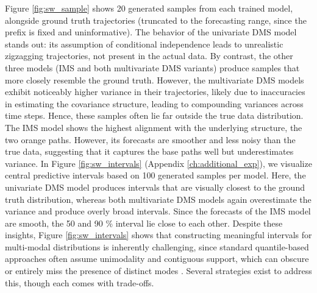 \documentclass[a4paper,oneside,bibliography=totoc]{scrbook}
\begin{document}
Figure \ref{fig:sw_sample} shows 20 generated samples from each trained model, alongside ground truth trajectories (truncated to the forecasting range, since the prefix is fixed and uninformative). The behavior of the univariate DMS model stands out: its assumption of conditional independence leads to unrealistic zigzagging trajectories, not present in the actual data.
By contrast, the other three models (IMS and both multivariate DMS variants) produce samples that more closely resemble the ground truth. However, the multivariate DMS models exhibit noticeably higher variance in their trajectories, likely due to inaccuracies in estimating the covariance structure, leading to compounding variances across time steps. 
Hence, these samples often lie far outside the true data distribution.
The IMS model shows the highest alignment with the underlying structure, the two orange paths. However, its forecasts are smoother and less noisy than the true data, suggesting that it captures the base paths well but underestimates variance.
In Figure \ref{fig:sw_intervals} (Appendix \ref{ch:additional_exp}), we visualize central predictive intervals based on 100 generated samples per model. 
Here, the univariate DMS model produces intervals that are visually closest to the ground truth distribution, whereas both multivariate DMS models again overestimate the variance and produce overly broad intervals. 
Since the forecasts of the IMS model are smooth, the 50 and 90 \% interval lie close to each other. %
Despite these insights, Figure \ref{fig:sw_intervals} shows that constructing meaningful intervals for multi-modal distributions is inherently challenging, since standard quantile-based approaches often assume unimodality and contiguous support, which can obscure or entirely miss the presence of distinct modes \cite{deliu_alternative_2024}. 
Several strategies exist to address this, though each comes with trade-offs. 
\end{document}
